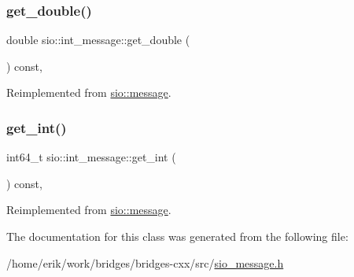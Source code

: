 \mbox{\label{classsio_1_1int__message_a7fdc141b0fe04ce1b75054b6de110f2c}} 
\subsubsection{\texorpdfstring{get\+\_\+double()}{get\_double()}}
{\footnotesize\ttfamily double sio\+::int\+\_\+message\+::get\+\_\+double (\begin{DoxyParamCaption}{ }\end{DoxyParamCaption}) const\hspace{0.3cm}{\ttfamily [inline]}, {\ttfamily [virtual]}}



Reimplemented from \hyperlink{classsio_1_1message_aa89963cd233b29653df1ce1943f9ea57}{sio\+::message}.

\mbox{\label{classsio_1_1int__message_ad9159e1285bd3efd15b8f87699a9b133}} 
\subsubsection{\texorpdfstring{get\+\_\+int()}{get\_int()}}
{\footnotesize\ttfamily int64\+\_\+t sio\+::int\+\_\+message\+::get\+\_\+int (\begin{DoxyParamCaption}{ }\end{DoxyParamCaption}) const\hspace{0.3cm}{\ttfamily [inline]}, {\ttfamily [virtual]}}



Reimplemented from \hyperlink{classsio_1_1message_ae77c363200284d6741f0ac92f0e13ed2}{sio\+::message}.



The documentation for this class was generated from the following file\+:\begin{DoxyCompactItemize}
\item 
/home/erik/work/bridges/bridges-\/cxx/src/\hyperlink{sio__message_8h}{sio\+\_\+message.\+h}\end{DoxyCompactItemize}
